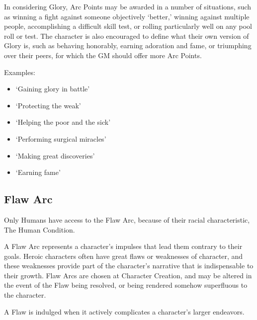 \documentclass[oneside,11pt,english]{book}
\begin{document}
 
In considering Glory, Arc Points may be awarded in a number of situations, such as winning a fight 
against someone objectively ‘better,’ winning against multiple people, accomplishing a difficult skill test, 
or rolling particularly well on any pool roll or test. The character is also encouraged to define what their 
own version of Glory is, such as behaving honorably, earning adoration and fame, or triumphing over 
their peers, for which the GM should offer more Arc Points. 

 

Examples: 
\begin{itemize}
\item ‘Gaining glory in battle’ 
\item ‘Protecting the weak’ 
\item ‘Helping the poor and the sick’ 
\item ‘Performing surgical miracles’ 
\item ‘Making great discoveries’ 
\item ‘Earning fame’ 
\end{itemize}
 

\subsection{Flaw Arc} 
Only Humans have access to the Flaw Arc, because of their racial characteristic, The Human Condition. 
 

A Flaw Arc represents a character’s impulses that lead them contrary to their goals. Heroic characters 
often have great flaws or weaknesses of character, and these weaknesses provide part of the character’s 
narrative that is indispensable to their growth. Flaw Arcs are chosen at Character Creation, and may be 
altered in the event of the Flaw being resolved, or being rendered somehow superfluous to the character. 


A Flaw is indulged when it actively complicates a character’s larger endeavors. 
\end{document}
